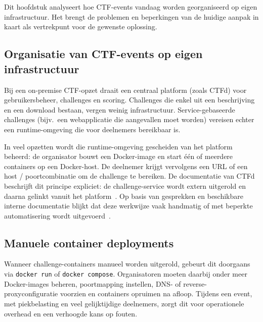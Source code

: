 
\chapter{}%
\label{ch:huidige-situatie}

Dit hoofdstuk analyseert hoe CTF-events vandaag worden georganiseerd op eigen infrastructuur. Het brengt de problemen en beperkingen van de huidige aanpak in kaart als vertrekpunt voor de gewenste oplossing.

\section{Organisatie van CTF-events op eigen infrastructuur}%
\label{sec:asis-organisatie}

Bij een on-premise CTF-opzet draait een centraal platform (zoals CTFd) voor gebruikersbeheer, challenges en scoring. Challenges die enkel uit een beschrijving en een download bestaan, vergen weinig infrastructuur. Service-gebaseerde challenges (bijv.\ een webapplicatie die aangevallen moet worden) vereisen echter een runtime-omgeving die voor deelnemers bereikbaar is.

In veel opzetten wordt die runtime-omgeving gescheiden van het platform beheerd: de organisator bouwt een Docker-image en start één of meerdere containers op een Docker-host. De deelnemer krijgt vervolgens een URL of een host / poortcombinatie om de challenge te bereiken. De documentatie van CTFd beschrijft dit principe expliciet: de challenge-service wordt extern uitgerold en daarna gelinkt vanuit het platform~\autocite{CTFd}. Op basis van gesprekken en beschikbare interne documentatie blijkt dat deze werkwijze vaak handmatig of met beperkte automatisering wordt uitgevoerd~\autocite{Singier2025}.

\section{Manuele container deployments}%
\label{sec:asis-manueel}

Wanneer challenge-containers manueel worden uitgerold, gebeurt dit doorgaans via \texttt{docker run} of \texttt{docker compose}. Organisatoren moeten daarbij onder meer Docker-images beheren, poortmapping instellen, DNS- of reverse-proxyconfiguratie voorzien en containers opruimen na afloop. Tijdens een event, met piekbelasting en veel gelijktijdige deelnemers, zorgt dit voor operationele overhead en een verhoogde kans op fouten.

